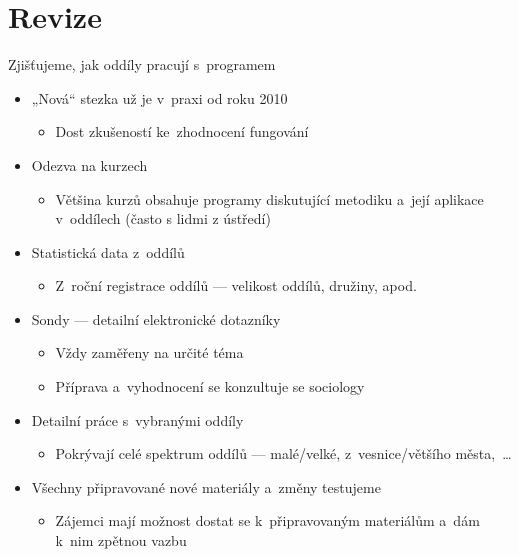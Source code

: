 \documentclass[compress, ucs, xelatex, xcolor=dvipsnames, print,
  hyperref={
    bookmarks=true,
    unicode=true,
    colorlinks=true,
    plainpages=false,
    pdfkeywords={Junak, Pedagogika, Skaut, Skauting, Vychovna metoda},
    linkcolor=Black,
    anchorcolor=Black,
    citecolor=OliveGreen,
    filecolor=OliveGreen,
    menucolor=Black,
    urlcolor=OliveGreen,
    pdftex}
  ]{beamer}
\begin{document}
\section{Revize}

\begin{frame}{Zjišťujeme, jak oddíly pracují s~programem}
  \begin{itemize}
    \item „Nová“ stezka už je v~praxi od roku 2010
    \begin{itemize}
      \item Dost zkušeností ke~zhodnocení fungování
    \end{itemize}
    \item Odezva na kurzech
    \begin{itemize}
      \item Většina kurzů obsahuje programy diskutující metodiku a~její aplikace v~oddílech (často s lidmi z ústředí)
    \end{itemize}
    \item Statistická data z~oddílů
    \begin{itemize}
      \item Z~roční registrace oddílů --- velikost oddílů, družiny, apod.
    \end{itemize}
    \item Sondy --- detailní elektronické dotazníky
    \begin{itemize}
      \item Vždy zaměřeny na určité téma
      \item Příprava a~vyhodnocení se konzultuje se sociology
    \end{itemize}
    \item Detailní práce s~vybranými oddíly
    \begin{itemize}
      \item Pokrývají celé spektrum oddílů --- malé/velké, z~vesnice/většího města,~\ldots
    \end{itemize}
    \item Všechny připravované nové materiály a~změny testujeme
    \begin{itemize}
      \item Zájemci mají možnost dostat se k~připravovaným materiálům a~dám k~nim zpětnou vazbu
    \end{itemize}
  \end{itemize}
\end{frame}
\end{document}
